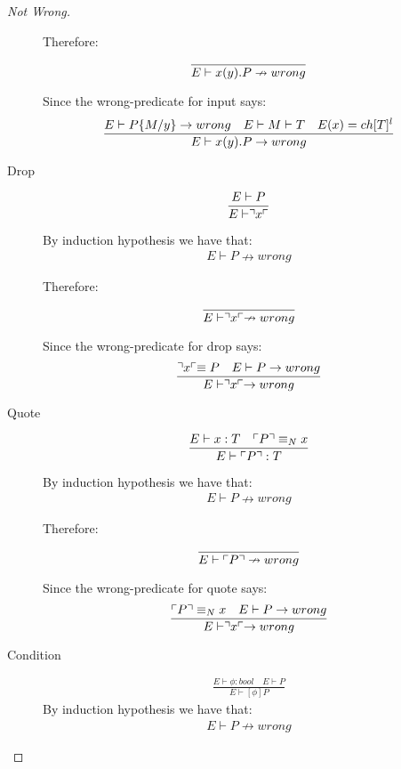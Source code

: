 \begin{proof}[Not Wrong]
\begin{description}
		Therefore:
		\begin{align*}
		\frac{}{E \vdash x(y).P \nrightarrow wrong}
		\end{align*}
		
		Since the wrong-predicate for input says:
		\begin{align*}
		\frac{E \vdash P\{M/y\}\rightarrow wrong \quad E\vdash M\vdash T \quad E(x)=ch[T]^l}{E \vdash x(y).P \rightarrow wrong}
		\end{align*}
	\item[Drop]
		\begin{align*}
		\frac{E \vdash P}{E \vdash \urcorner x \ulcorner}
		\end{align*}
		
		By induction hypothesis we have that:
		\begin{align*}
		E \vdash P \nrightarrow wrong
		\end{align*}
		
		Therefore:
		\begin{align*}
		\frac{}{E \vdash \urcorner x \ulcorner \nrightarrow wrong}
		\end{align*}
		
		Since the wrong-predicate for drop says:
		\begin{align*}
		\frac{\urcorner x \ulcorner \equiv P \quad E \vdash P \rightarrow wrong}{E \vdash \urcorner x \ulcorner \rightarrow wrong}
		\end{align*}
	\item[Quote]
		\begin{align*}
		\frac{E \vdash x:T \quad \ulcorner P \urcorner \equiv _N x}{E \vdash \ulcorner P \urcorner:T}
		\end{align*}
		
		By induction hypothesis we have that:
		\begin{align*}
		E \vdash P \nrightarrow wrong
		\end{align*}
		
		Therefore:
		\begin{align*}
		\frac{}{E \vdash \ulcorner P \urcorner \nrightarrow wrong}
		\end{align*}
		
		Since the wrong-predicate for quote says:
		\begin{align*}
		\frac{\ulcorner P \urcorner \equiv _N x \quad E \vdash P \rightarrow wrong}{E \vdash \urcorner x \ulcorner \rightarrow wrong}
		\end{align*}
	\item[Condition]
		\begin{align*}
		\frac{E \vdash \phi : bool \quad E \vdash P}{E \vdash [\phi]P}
		\end{align*}
		By induction hypothesis we have that:
		\begin{align*}
		E \vdash P \nrightarrow wrong
		\end{align*}
		

\end{description}
\end{proof}
